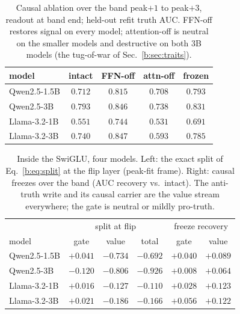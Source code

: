 \documentclass[11pt]{article}
\begin{document}
\begin{table}[H]
\centering
\caption{Causal ablation over the band peak$+1$ to peak$+3$, readout at
band end; held-out refit truth AUC. FFN-off restores signal on every model;
attention-off is neutral on the smaller models and destructive on both 3B
models (the tug-of-war of Sec.~\ref{b:sec:traits}).}
\label{b:tab:ablate}
\begin{tabular}{lcccc}
\toprule
model & intact & FFN-off & attn-off & frozen \\
\midrule
Qwen2.5-1.5B & $0.712$ & $0.815$ & $0.708$ & $0.793$ \\
Qwen2.5-3B   & $0.793$ & $0.846$ & $0.738$ & $0.831$ \\
Llama-3.2-1B & $0.551$ & $0.744$ & $0.531$ & $0.691$ \\
Llama-3.2-3B & $0.740$ & $0.847$ & $0.593$ & $0.785$ \\
\bottomrule
\end{tabular}
\end{table}

\begin{table}[H]
\centering
\caption{Inside the SwiGLU, four models. Left: the exact split of
Eq.~\ref{b:eq:split} at the flip layer (peak-fit frame). Right: causal
freezes over the band (AUC recovery vs.\ intact). The anti-truth write and
its causal carrier are the value stream everywhere; the gate is neutral or
mildly pro-truth.}
\label{b:tab:swiglu}
\begin{tabular}{lccccc}
\toprule
 & \multicolumn{3}{c}{split at flip} & \multicolumn{2}{c}{freeze recovery} \\
model & gate & value & total & gate & value \\
\midrule
Qwen2.5-1.5B & $+0.041$ & $-0.734$ & $-0.692$ & $+0.040$ & $+0.089$ \\
Qwen2.5-3B   & $-0.120$ & $-0.806$ & $-0.926$ & $+0.008$ & $+0.064$ \\
Llama-3.2-1B & $+0.016$ & $-0.127$ & $-0.110$ & $+0.028$ & $+0.123$ \\
Llama-3.2-3B & $+0.021$ & $-0.186$ & $-0.166$ & $+0.056$ & $+0.122$ \\
\bottomrule
\end{tabular}
\end{table}
\end{document}

